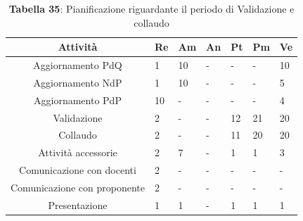 \begin{table}[H]
	\centering
	\renewcommand{\arraystretch}{1.5}
	\begin{tabular}{|c|p{10mm}|p{10mm}|p{10mm}|p{10mm}|p{10mm}|p{10mm}|}
		\hline
		\rowcolor{lighter-grayer}
		Attività & Re & Am & An & Pt & Pm & Ve \\ \hline
		Aggiornamento PdQ          & 1  & 10 & - & - & - & 10 \\ \hline
		Aggiornamento NdP          & 1  & 10 & - & - & - & 5  \\ \hline
		Aggiornamento PdP          & 10 & - & - & - & - & 4  \\ \hline
		Validazione                & 2  & - & - & 12 & 21 & 20 \\ \hline
		Collaudo                   & 2  & - & - & 11 & 20 & 20 \\ \hline
		Attività accessorie 	   & 2  & 7  & - & 1  & 1  & 3  \\ \hline
		Comunicazione con docenti  & 2  & - & - & - & - & -   \\ \hline
		Comunicazione con proponente& 2  & - & - & - & - & -   \\ \hline
		Presentazione              & 1  & 1  & - & 1  & 1  & 1 \\
		\hline
	\end{tabular}
	\caption*{\textbf{Tabella 35}: Pianificazione riguardante il periodo di Validazione e collaudo\\}
\end{table}